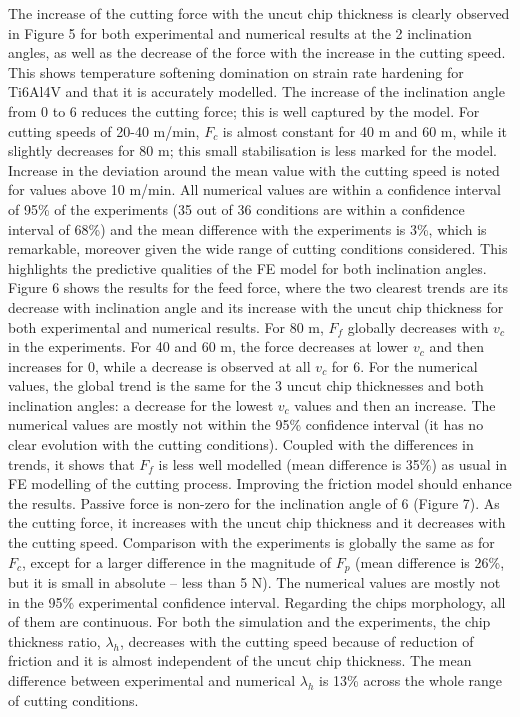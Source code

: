 \documentclass[preprint,12pt,times]{elsarticle}
\begin{document}
The increase of the cutting force with the uncut chip thickness is clearly observed in Figure 5 for both experimental and numerical results at the 2 inclination angles, as well as the decrease of the force with the increase in the cutting speed. This shows temperature softening domination on strain rate hardening for Ti6Al4V and that it is accurately modelled. The increase of the inclination angle from 0\textdegree{} to 6\textdegree{} reduces the cutting force; this is well captured by the model. For cutting speeds of 20-40 m/min, $F_c$ is almost constant for 40 \textmu{}m and 60 \textmu{}m, while it slightly decreases for 80 \textmu{}m; this small stabilisation is less marked for the model.
Increase in the deviation around the mean value with the cutting speed is noted for values above 10 m/min. All numerical values are within a confidence interval of 95\% of the experiments (35 out of 36 conditions are within a confidence interval of 68\%) and the mean difference with the experiments is 3\%, which is remarkable, moreover given the wide range of cutting conditions considered. This highlights the predictive qualities of the FE model for both inclination angles.
Figure 6 shows the results for the feed force, where the two clearest trends are its decrease with inclination angle and its increase with the uncut chip thickness for both experimental and numerical results. For 80 \textmu{}m, $F_f$ globally decreases with $v_c$ in the experiments. For 40 and 60 \textmu{}m, the force decreases at lower $v_c$ and then increases for 0\textdegree{}, while a decrease is observed at all $v_c$ for 6\textdegree{}. For the numerical values, the global trend is the same for the 3 uncut chip thicknesses and both inclination angles: a decrease for the lowest $v_c$ values and then an increase. The numerical values are mostly not within the 95\% confidence interval (it has no clear evolution with the cutting conditions). Coupled with the differences in trends, it shows that $F_f$ is less well modelled (mean difference is 35\%) as usual in FE modelling of the cutting process. Improving the friction model should enhance the results.
Passive force is non-zero for the inclination angle of 6\textdegree{} (Figure 7). As the cutting force, it increases with the uncut chip thickness and it decreases with the cutting speed. Comparison with the experiments is globally the same as for $F_c$, except for a larger difference in the magnitude of $F_p$ (mean difference is 26\%, but it is small in absolute – less than 5 N). The numerical values are mostly not in the 95\% experimental confidence interval.
Regarding the chips morphology, all of them are continuous. For both the simulation and the experiments, the chip thickness ratio, $\lambda_h$, decreases with the cutting speed because of reduction of friction and it is almost independent of the uncut chip thickness. The mean difference between experimental and numerical $\lambda_h$ is 13\% across the whole range of cutting conditions.
\end{document}
